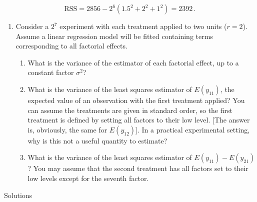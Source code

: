 \documentclass[
]{book}
\theoremstyle{definition}
\theoremstyle{definition}
\theoremstyle{definition}
\theoremstyle{definition}
\theoremstyle{remark}
\begin{document}
\[
\mbox{RSS} = 2856 - 2^6(1.5^2 + 2^2 + 1^2) = 2392\,.
\]

\begin{enumerate}
\def\labelenumi{\arabic{enumi}.}
\setcounter{enumi}{2}
\item
  \citep[Adapted from][]{Morris2011} Consider a \(2^7\) experiment with each treatment applied to two units (\(r=2\)). Assume a linear regression model will be fitted containing terms corresponding to all factorial effects.

  \begin{enumerate}
  \def\labelenumii{\alph{enumii}.}
  \item
    What is the variance of the estimator of each factorial effect, up to a constant factor \(\sigma^2\)?
  \item
    What is the variance of the least squares estimator of \(E(y_{11})\), the expected value of an observation with the first treatment applied? You can assume the treatments are given in standard order, so the first treatment is defined by setting all factors to their low level. {[}The answer is, obviously, the same for \(E(y_{12})\){]}. In a practical experimental setting, why is this not a useful quantity to estimate?
  \item
    What is the variance of the least squares estimator of \(E(y_{11}) - E(y_{21})\)? You may assume that the second treatment has all factors set to their low levels except for the seventh factor.
  \end{enumerate}
\end{enumerate}

Solutions
\end{document}
